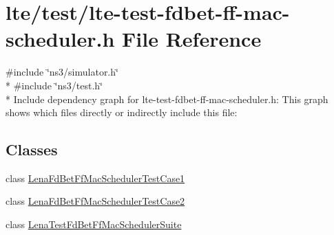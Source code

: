 \hypertarget{lte-test-fdbet-ff-mac-scheduler_8h}{}\section{lte/test/lte-\/test-\/fdbet-\/ff-\/mac-\/scheduler.h File Reference}
\label{lte-test-fdbet-ff-mac-scheduler_8h}
{\ttfamily \#include \char`\"{}ns3/simulator.\+h\char`\"{}}\\*
{\ttfamily \#include \char`\"{}ns3/test.\+h\char`\"{}}\\*
Include dependency graph for lte-\/test-\/fdbet-\/ff-\/mac-\/scheduler.h\+:
This graph shows which files directly or indirectly include this file\+:
\subsection*{Classes}
\begin{DoxyCompactItemize}
\item 
class \hyperlink{classLenaFdBetFfMacSchedulerTestCase1}{Lena\+Fd\+Bet\+Ff\+Mac\+Scheduler\+Test\+Case1}
\item 
class \hyperlink{classLenaFdBetFfMacSchedulerTestCase2}{Lena\+Fd\+Bet\+Ff\+Mac\+Scheduler\+Test\+Case2}
\item 
class \hyperlink{classLenaTestFdBetFfMacSchedulerSuite}{Lena\+Test\+Fd\+Bet\+Ff\+Mac\+Scheduler\+Suite}
\end{DoxyCompactItemize}
